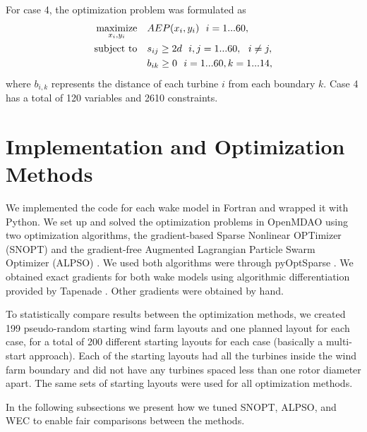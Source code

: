 \documentclass{jpconf}
\begin{document}
%
For case 4, the optimization problem was formulated as
%
\begin{equation}
\label{eqn:opt3}
\begin{aligned} [b]
\underset{x_i,y_i}{\textrm{maximize}} \quad & AEP(x_i,y_i)~~i=1...60,\\
\textrm{subject to} \quad & s_{ij} \geq 2\*d~~i,j=1...60,~~i \neq j,\\
& b_{ik} \geq 0 ~~ i=1...60, k=1...14,
\end{aligned}
\end{equation}
%
where $b_{i,k}$ represents the distance of each turbine $i$ from each boundary $k$. Case 4 has a total of 120 variables and 2610 constraints.

\section{Implementation and Optimization Methods}\label{sec:tuning}

We implemented the code for each wake model in Fortran and wrapped it with Python. We set up and solved the optimization problems in OpenMDAO \cite{gray2010_OpenMDAO} using two optimization algorithms, the gradient-based Sparse Nonlinear OPTimizer (SNOPT)  \cite{gill2005} and the gradient-free Augmented Lagrangian Particle Swarm Optimizer (ALPSO) \cite{jansen2011_alpso}. We used both algorithms were through pyOptSparse \cite{perez2012a}. We obtained exact gradients for both wake models using algorithmic differentiation provided by Tapenade \cite{tapenade2013}. Other gradients were obtained by hand. 

To statistically compare results between the optimization methods, we created 199 pseudo-random starting wind farm layouts and one planned layout for each case, for a total of 200 different starting layouts for each case (basically a multi-start approach). Each of the starting layouts had all the turbines inside the wind farm boundary and did not have any turbines spaced less than one rotor diameter apart. The same sets of starting layouts were used for all optimization methods.  

In the following subsections we present how we tuned SNOPT, ALPSO, and WEC to enable fair comparisons between the methods.
\end{document}
